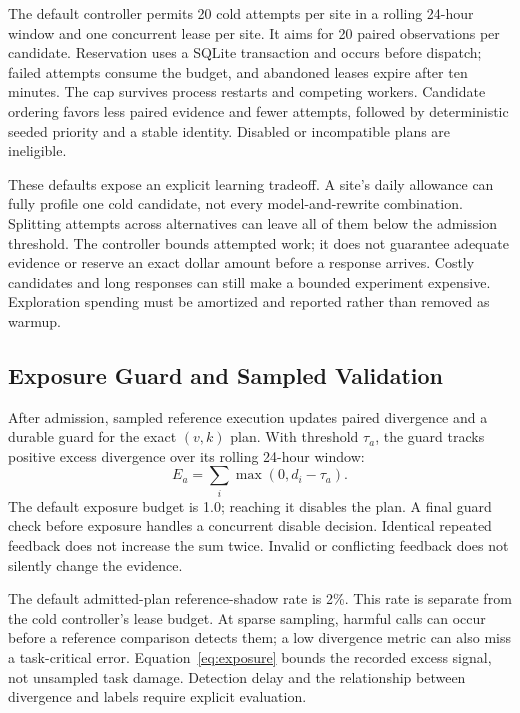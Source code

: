 The default controller permits 20 cold attempts per site in a rolling 24-hour
window and one concurrent lease per site. It aims for 20 paired observations per
candidate. Reservation uses a SQLite transaction and occurs before dispatch;
failed attempts consume the budget, and abandoned leases expire after ten minutes.
The cap survives process restarts and competing workers. Candidate ordering favors
less paired evidence and fewer attempts, followed by deterministic seeded priority
and a stable identity. Disabled or incompatible plans are ineligible.

These defaults expose an explicit learning tradeoff. A site's daily allowance can
fully profile one cold candidate, not every model-and-rewrite combination. Splitting
attempts across alternatives can leave all of them below the admission threshold.
The controller bounds attempted work; it does not guarantee adequate evidence or
reserve an exact dollar amount before a response arrives. Costly candidates and
long responses can still make a bounded experiment expensive. Exploration spending
must be amortized and reported rather than removed as warmup.

\subsection{Exposure Guard and Sampled Validation}
\label{sec:guard}

After admission, sampled reference execution updates paired divergence and a
durable guard for the exact $(v,k)$ plan. With threshold $\tau_a$, the guard tracks
positive excess divergence over its rolling 24-hour window:
\begin{equation}
 E_a=\sum_i\max(0,d_i-\tau_a).
 \label{eq:exposure}
\end{equation}
The default exposure budget is 1.0; reaching it disables the plan. A final guard
check before exposure handles a concurrent disable decision. Identical repeated
feedback does not increase the sum twice. Invalid or conflicting feedback does
not silently change the evidence.

The default admitted-plan reference-shadow rate is 2\%. This rate is separate from
the cold controller's lease budget. At sparse sampling, harmful calls can occur
before a reference comparison detects them; a low divergence metric can also miss
a task-critical error. Equation~\ref{eq:exposure} bounds the recorded excess signal,
not unsampled task damage. Detection delay and the relationship between divergence
and labels require explicit evaluation.

